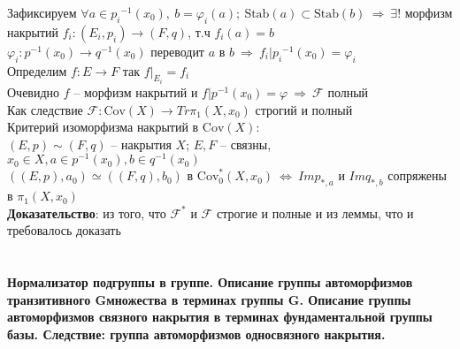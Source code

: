 	Зафиксируем $\forall a \in {p_i}^{-1}(x_0),\ b = \varphi_i(a);\ \text{Stab}(a) \subset \text{Stab}(b)\ \Rightarrow\ \exists!$ морфизм накрытий $f_i: (E_i,p_i) \rightarrow (F,q)$, т.ч $f_i(a) = b$\\
	$\varphi_i: p^{-1}(x_0) \rightarrow q^{-1}(x_0)$ переводит $a$ в $b\ \Rightarrow\ f_i|{p_i}^{-1}(x_0) = \varphi_i$\\
	Определим $f: E \rightarrow F$ так $f|_{E_i} = f_i$\\
	Очевидно $f$ -- морфизм накрытий и $f|{p}^{-1}(x_0) = \varphi\ \Rightarrow\ \mathcal{F}$ полный\\
	Как следствие $\mathcal{F}: \text{Cov}(X) \rightarrow Tr{\pi}_1 (X, x_0)$ строгий и полный\\
	Критерий изоморфизма накрытий в $\text{Cov}(X)$:\\
	$(E,p)\sim (F,q)$ -- накрытия $X$; $E,F$ -- связны, $x_0 \in X, a \in p^{-1}(x_0), b \in q^{-1}(x_0)$\\
	$((E, p), a_0) \simeq ((F,q), b_0)$ в $\text{Cov}_0^{*}(X, x_0)\ \Leftrightarrow\ Im p_{*,a}$ и $Im q_{*,b}$ сопряжены в ${\pi}_1(X, x_0)$\\
	\textbf{Доказательство}: из того, что $\mathcal{F}^{*}$ и $\mathcal{F}$ строгие и полные и из леммы, что и требовалось доказать\\
	


\newpage
	\section{}
	\textbf{Нормализатор подгруппы в группе. Описание группы автоморфизмов транзитивного Gмножества в терминах группы G. Описание группы автоморфизмов связного накрытия в терминах фундаментальной группы базы. Следствие: группа автоморфизмов односвязного накрытия.}\\
	\\	



\newpage
